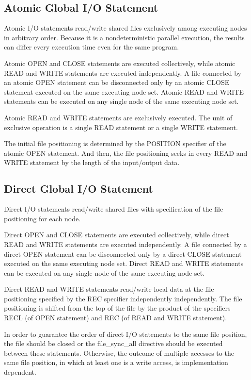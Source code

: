    \subsection{Atomic Global I/O Statement}

   Atomic I/O statements read/write shared files exclusively among executing nodes
   in arbitrary order.
   Because it is a nondeterministic parallel execution,
   the results can differ every execution time even for the same program.

   Atomic OPEN and CLOSE statements are executed collectively, while atomic
   READ and WRITE statements are executed independently.
   A file connected by an atomic OPEN statement can be disconnected only by an
   atomic CLOSE statement executed on the same executing node set.
   Atomic READ and WRITE statements can be executed on any single node of the
   same executing node set.

   Atomic READ and WRITE statements are exclusively executed.
   The unit of exclusive operation is a single READ statement or a single WRITE
   statement.

   The initial file positioning is determined by the POSITION specifier of
   the atomic OPEN statement.
   And then, the file positioning seeks in every READ and WRITE statement 
   by the length of the input/output data.


   \subsection{Direct Global I/O Statement}

   Direct I/O statements read/write shared files with specification of the
   file positioning for each node.

   Direct OPEN and CLOSE statements are executed collectively, while direct
   READ and WRITE statements are executed independently.
   A file connected by a direct OPEN statement can be disconnected only by a
   direct CLOSE statement executed on the same executing node set.
   Direct READ and WRITE statements can be executed on any single node of the
   same executing node set.
   
   Direct READ and WRITE statements read/write local data at the file positioning
   specified by the REC specifier independently independently.
   The file positioning is shifted from the top of the file by the product 
   of the specifiers RECL (of OPEN statement) and
   REC (of READ and WRITE statement). 

   In order to guarantee the order of direct I/O statements to the same file position, the file should be closed or the file\_sync\_all directive should be executed between these statements. Otherwise, the outcome of multiple accesses to the same file position, in which at least one is a write access, is implementation dependent.

